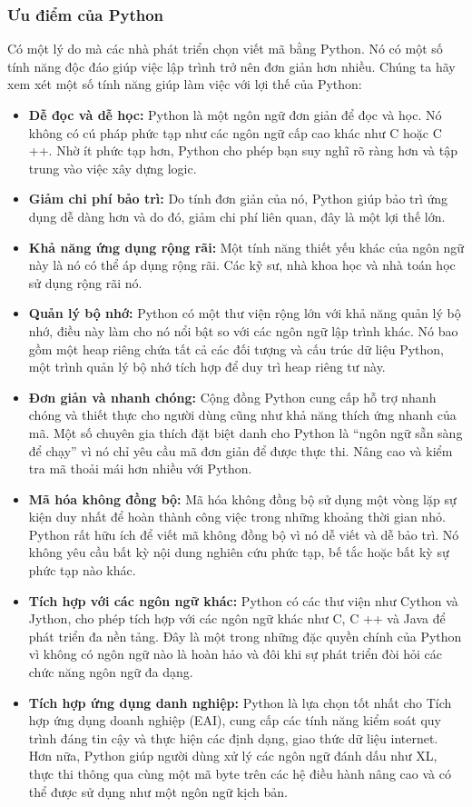 \documentclass{article} %
\begin{document}
\subsubsection{Ưu điểm của Python}
Có một lý do mà các nhà phát triển chọn viết mã bằng Python. Nó có một số tính năng độc đáo giúp việc lập trình trở nên đơn giản hơn nhiều. Chúng ta hãy xem xét một số tính năng giúp làm việc với lợi thế của Python:
\begin{itemize}
    \item \textbf{Dễ đọc và dễ học:} Python là một ngôn ngữ đơn giản để đọc và học. Nó không có cú pháp phức tạp như các ngôn ngữ cấp cao khác như C hoặc C ++. Nhờ ít phức tạp hơn, Python cho phép bạn suy nghĩ rõ ràng hơn và tập trung vào việc xây dựng logic.
    \item \textbf{Giảm chi phí bảo trì:} Do tính đơn giản của nó, Python giúp bảo trì ứng dụng dễ dàng hơn và do đó, giảm chi phí liên quan, đây là một lợi thế lớn.
    \item \textbf{Khả năng ứng dụng rộng rãi:} Một tính năng thiết yếu khác của ngôn ngữ này là nó có thể áp dụng rộng rãi. Các kỹ sư, nhà khoa học và nhà toán học sử dụng rộng rãi nó.
    \item \textbf{Quản lý bộ nhớ:} Python có một thư viện rộng lớn với khả năng quản lý bộ nhớ, điều này làm cho nó nổi bật so với các ngôn ngữ lập trình khác. Nó bao gồm một heap riêng chứa tất cả các đối tượng và cấu trúc dữ liệu Python, một trình quản lý bộ nhớ tích hợp để duy trì heap riêng tư này.
    \item \textbf{Đơn giản và nhanh chóng:} Cộng đồng Python cung cấp hỗ trợ nhanh chóng và thiết thực cho người dùng cũng như khả năng thích ứng nhanh của mã. Một số chuyên gia thích đặt biệt danh cho Python là “ngôn ngữ sẵn sàng để chạy” vì nó chỉ yêu cầu mã đơn giản để được thực thi. Nâng cao và kiểm tra mã thoải mái hơn nhiều với Python.
    \item \textbf{Mã hóa không đồng bộ:} Mã hóa không đồng bộ sử dụng một vòng lặp sự kiện duy nhất để hoàn thành công việc trong những khoảng thời gian nhỏ. Python rất hữu ích để viết mã không đồng bộ vì nó dễ viết và dễ bảo trì. Nó không yêu cầu bất kỳ nội dung nghiên cứu phức tạp, bế tắc hoặc bất kỳ sự phức tạp nào khác.
    \item \textbf{Tích hợp với các ngôn ngữ khác:} Python có các thư viện như Cython và Jython, cho phép tích hợp với các ngôn ngữ khác như C, C ++ và Java để phát triển đa nền tảng. Đây là một trong những đặc quyền chính của Python vì không có ngôn ngữ nào là hoàn hảo và đôi khi sự phát triển đòi hỏi các chức năng ngôn ngữ đa dạng.
    \item \textbf{Tích hợp ứng dụng danh nghiệp:} Python là lựa chọn tốt nhất cho Tích hợp ứng dụng doanh nghiệp (EAI), cung cấp các tính năng kiểm soát quy trình đáng tin cậy và thực hiện các định dạng, giao thức dữ liệu internet. Hơn nữa, Python giúp người dùng xử lý các ngôn ngữ đánh dấu như XL, thực thi thông qua cùng một mã byte trên các hệ điều hành nâng cao và có thể được sử dụng như một ngôn ngữ kịch bản.
\end{itemize}
\end{document}
